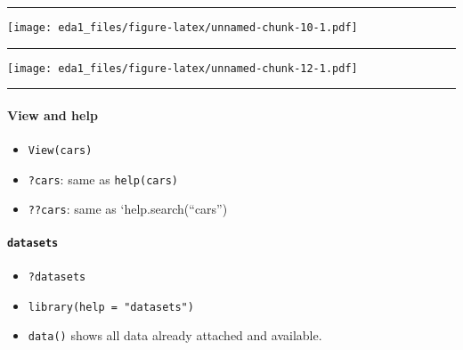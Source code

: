 \documentclass[
]{article}
\newenvironment{Shaded}{\begin{snugshade}}{\end{snugshade}}
\newcommand{\FunctionTok}[1]{\textcolor[rgb]{0.00,0.00,0.00}{#1}}
\newcommand{\NormalTok}[1]{#1}
\newcommand{\SpecialCharTok}[1]{\textcolor[rgb]{0.00,0.00,0.00}{#1}}
\providecommand{\tightlist}{%
  \setlength{\itemsep}{0pt}\setlength{\parskip}{0pt}}
\begin{document}
\begin{center}\rule{0.5\linewidth}{0.5pt}\end{center}

\begin{Shaded}
\end{Shaded}

\texttt{[image: eda1\_files/figure-latex/unnamed-chunk-10-1.pdf]}

\begin{center}\rule{0.5\linewidth}{0.5pt}\end{center}

\begin{Shaded}
\end{Shaded}

\texttt{[image: eda1\_files/figure-latex/unnamed-chunk-12-1.pdf]}

\begin{center}\rule{0.5\linewidth}{0.5pt}\end{center}

\hypertarget{view-and-help}{%
\paragraph{View and help}\label{view-and-help}}

\begin{itemize}
\tightlist
\item
  \texttt{View(cars)}
\item
  \texttt{?cars}: same as \texttt{help(cars)}
\item
  \texttt{??cars}: same as `help.search(``cars'')
\end{itemize}

\hypertarget{datasets}{%
\paragraph{\texorpdfstring{\texttt{datasets}}{datasets}}\label{datasets}}

\begin{itemize}
\item
  \texttt{?datasets}
\item
  \texttt{library(help\ =\ "datasets")}
\item
  \texttt{data()} shows all data already attached and available.
\end{itemize}
\end{document}
